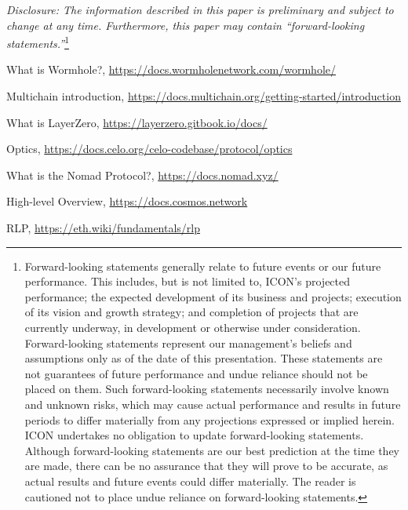 \documentclass{article}
\begin{document}
\textit{Disclosure: The information described in this paper is preliminary and subject to change at any time. Furthermore, this paper may contain “forward-looking statements.”}\footnote{Forward-looking statements generally relate to future events or our future performance. This includes, but is not limited to, ICON’s projected performance; the expected development of its business and projects; execution of its vision and growth strategy; and completion of projects that are currently underway, in development or otherwise under consideration. Forward-looking statements represent our management’s beliefs and assumptions only as of the date of this presentation. These statements are not guarantees of future performance and undue reliance should not be placed on them. Such forward-looking statements necessarily involve known and unknown risks, which may cause actual performance and results in future periods to differ materially from any projections expressed or implied herein. ICON undertakes no obligation to update forward-looking statements. Although forward-looking statements are our best prediction at the time they are made, there can be no assurance that they will prove to be accurate, as actual results and future events could differ materially. The reader is cautioned not to place undue reliance on forward-looking statements.}

  

\begin{thebibliography}{1}

What is Wormhole?, \url{https://docs.wormholenetwork.com/wormhole/}

Multichain introduction, \url{https://docs.multichain.org/getting-started/introduction}

What is LayerZero, \url{https://layerzero.gitbook.io/docs/}

Optics, \url{https://docs.celo.org/celo-codebase/protocol/optics}

What is the Nomad Protocol?, \url{https://docs.nomad.xyz/}

High-level Overview, \url{https://docs.cosmos.network}

RLP, \url{https://eth.wiki/fundamentals/rlp}

\end{thebibliography}
\end{document}

